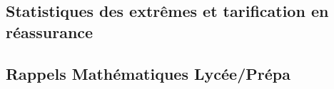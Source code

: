 \documentclass[french,a4paper]{article}
\theoremstyle{sansparenthese}
\begin{document}
\begin{multicols}{2}	
	
\end{multicols}

\begin{center}
	\section*{Statistiques des extrêmes et tarification en réassurance}
	\medskip
\end{center}

\begin{multicols}{2}
	
\end{multicols}

\newpage

\begin{center}
\section*{Rappels Mathématiques Lycée/Prépa}
\medskip
\end{center}

\begin{multicols}{2}	

\end{multicols}
\end{document}
